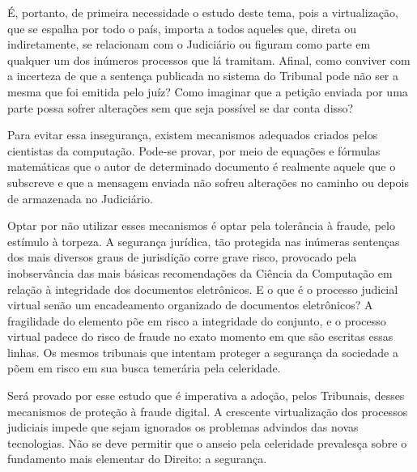   É, portanto, de primeira necessidade o estudo deste tema, pois
  a virtualização, que se espalha por todo o país, importa a
  todos aqueles que, direta ou indiretamente, se relacionam com o
  Judiciário ou figuram como parte em qualquer um dos inúmeros
  processos que lá tramitam. Afinal, como conviver com a
  incerteza de que a sentença publicada no sistema do Tribunal
  pode não ser a mesma que foi emitida pelo juíz? Como imaginar
  que a petição enviada por uma parte possa sofrer alterações sem
  que seja possível se dar conta disso?\par

  Para evitar essa insegurança, existem mecanismos adequados
  criados pelos cientistas da computação. Pode-se provar, por
  meio de equações e fórmulas matemáticas que o autor de
  determinado documento é realmente aquele que o subscreve e que
  a mensagem enviada não sofreu alterações no caminho ou depois
  de armazenada no Judiciário.\par

  Optar por não utilizar esses mecanismos é optar pela tolerância
  à fraude, pelo estímulo à torpeza. A segurança jurídica, tão
  protegida nas inúmeras sentenças dos mais diversos graus de
  jurisdição corre grave risco, provocado pela inobservância das
  mais básicas recomendações da Ciência da Computação em relação
  à integridade dos documentos eletrônicos. E o que é o processo
  judicial virtual senão um encadeamento organizado de documentos
  eletrônicos? A fragilidade do elemento põe em risco a
  integridade do conjunto, e o processo virtual padece do risco
  de fraude no exato momento em que são escritas essas linhas. Os
  mesmos tribunais que intentam proteger a segurança da sociedade
  a põem em risco em sua busca temerária pela celeridade.\par

  Será provado por esse estudo que é imperativa a adoção,
  pelos Tribunais, desses mecanismos de proteção à fraude
  digital. A crescente virtualização dos processos judiciais
  impede que sejam ignorados os problemas advindos das novas
  tecnologias. Não se deve permitir que o anseio pela celeridade
  prevalesça sobre o fundamento mais elementar do Direito: a
  segurança.
